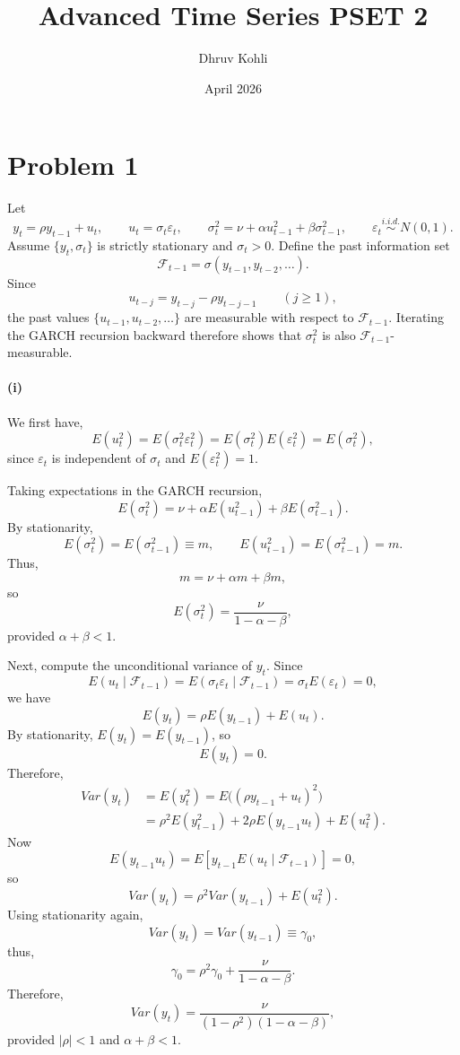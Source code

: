 \documentclass[11pt]{article}
\title{Advanced Time Series PSET 2}
\author{Dhruv Kohli}
\date{April 2026}
\begin{document}
\maketitle

\section{Problem 1}

Let
\[
y_t=\rho y_{t-1}+u_t,\qquad
u_t=\sigma_t\varepsilon_t,\qquad
\sigma_t^2=\nu+\alpha u_{t-1}^2+\beta \sigma_{t-1}^2,
\qquad
\varepsilon_t \overset{i.i.d.}{\sim} N(0,1).
\]
Assume $\{y_t,\sigma_t\}$ is strictly stationary and $\sigma_t>0$. Define the past information set
\[
\mathcal F_{t-1}=\sigma(y_{t-1},y_{t-2},\dots).
\]
Since
\[
u_{t-j}=y_{t-j}-\rho y_{t-j-1}\qquad (j\ge 1),
\]
the past values $\{u_{t-1},u_{t-2},\dots\}$ are measurable with respect to $\mathcal F_{t-1}$. Iterating the GARCH recursion backward therefore shows that $\sigma_t^2$ is also $\mathcal F_{t-1}$-measurable.

\paragraph{(i)}

We first have,
\[
E(u_t^2)=E(\sigma_t^2\varepsilon_t^2)=E(\sigma_t^2)E(\varepsilon_t^2)=E(\sigma_t^2),
\]
since $\varepsilon_t$ is independent of $\sigma_t$ and $E(\varepsilon_t^2)=1$.

Taking expectations in the GARCH recursion,
\[
E(\sigma_t^2)=\nu+\alpha E(u_{t-1}^2)+\beta E(\sigma_{t-1}^2).
\]
By stationarity,
\[
E(\sigma_t^2)=E(\sigma_{t-1}^2)\equiv m,
\qquad
E(u_{t-1}^2)=E(\sigma_{t-1}^2)=m.
\]
Thus,
\[
m=\nu+\alpha m+\beta m,
\]
so
\[
{E(\sigma_t^2)=\frac{\nu}{1-\alpha-\beta}},
\]
provided $\alpha+\beta<1$.

Next, compute the unconditional variance of $y_t$. Since
\[
E(u_t\mid \mathcal F_{t-1})=E(\sigma_t\varepsilon_t\mid \mathcal F_{t-1})=\sigma_t E(\varepsilon_t)=0,
\]
we have
\[
E(y_t)=\rho E(y_{t-1})+E(u_t).
\]
By stationarity, $E(y_t)=E(y_{t-1})$, so
\[
E(y_t)=0.
\]
Therefore,
\begin{align*}
Var(y_t)
&=E(y_t^2)
=E\bigl((\rho y_{t-1}+u_t)^2\bigr) \\
&=\rho^2 E(y_{t-1}^2)+2\rho E(y_{t-1}u_t)+E(u_t^2).
\end{align*}
Now
\[
E(y_{t-1}u_t)=E\!\left[y_{t-1}E(u_t\mid \mathcal F_{t-1})\right]=0,
\]
so
\[
Var(y_t)=\rho^2Var(y_{t-1})+E(u_t^2).
\]
Using stationarity again,
\[
Var(y_t)=Var(y_{t-1})\equiv \gamma_0,
\]
thus,
\[
\gamma_0=\rho^2\gamma_0+\frac{\nu}{1-\alpha-\beta}.
\]
Therefore,
\[
{Var(y_t)=\frac{\nu}{(1-\rho^2)(1-\alpha-\beta)}},
\]
provided $|\rho|<1$ and $\alpha+\beta<1$.
\end{document}
